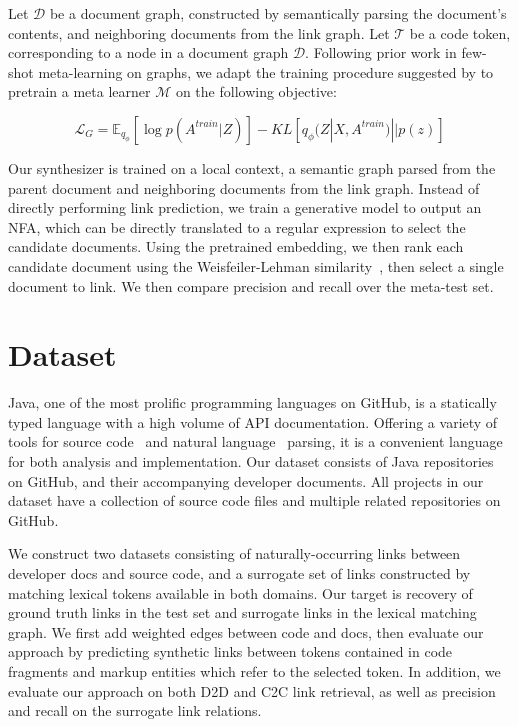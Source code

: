 \documentclass{article}
\begin{document}
Let $\mathcal D$ be a document graph, constructed by semantically parsing the document's contents, and neighboring documents from the link graph. Let $\mathcal T$ be a code token, corresponding to a node in a document graph $\mathcal D$. Following prior work in few-shot meta-learning on graphs, we adapt the training procedure suggested by \citet{bose2019meta} to pretrain a meta learner $\mathcal M$ on the following objective:

\begin{equation}
    \mathcal L_{G} = \mathbb E_{q_\phi}[\log p(A^{train}|Z)] - KL[q_\phi(Z|X, A^{train}) || p(z)]
\end{equation}

Our synthesizer is trained on a local context, a semantic graph parsed from the parent document and neighboring documents from the link graph. Instead of directly performing link prediction, we train a generative model to output an NFA, which can be directly translated to a regular expression to select the candidate documents. Using the pretrained embedding, we then rank each candidate document using the Weisfeiler-Lehman similarity~\citep{shervashidze2011weisfeiler}, then select a single document to link. We then compare precision and recall over the meta-test set.

\section{Dataset}

Java, one of the most prolific programming languages on GitHub, is a statically typed language with a high volume of API documentation. Offering a variety of tools for source code~\citep{parr2013definitive, hosseini2013javaparser, kovalenko2019pathminer} and natural language~\citep{manning2014stanford, grella2018non} parsing, it is a convenient language for both analysis and implementation. Our dataset consists of Java repositories on GitHub, and their accompanying developer documents. All projects in our dataset have a collection of source code files and multiple related repositories on GitHub.

We construct two datasets consisting of naturally-occurring links between developer docs and source code, and a surrogate set of links constructed by matching lexical tokens available in both domains. Our target is recovery of ground truth links in the test set and surrogate links in the lexical matching graph. We first add weighted edges between code and docs, then evaluate our approach by predicting synthetic links between tokens contained in code fragments and markup entities which refer to the selected token. In addition, we evaluate our approach on both D2D and C2C link retrieval, as well as precision and recall on the surrogate link relations.
\end{document}

